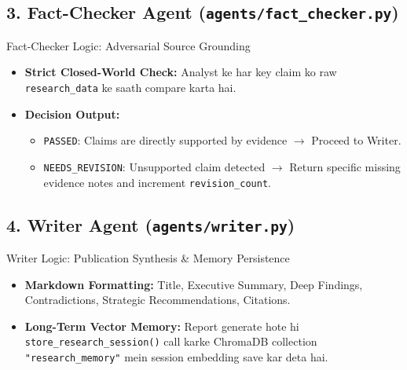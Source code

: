 \documentclass[9.5pt, a4paper]{article}
\begin{document}
\vspace{-4pt}
\subsection{3. Fact-Checker Agent (\texttt{agents/fact\_checker.py})}
\begin{agentbox}{Fact-Checker Logic: Adversarial Source Grounding}
\begin{itemize}
    \item \textbf{Strict Closed-World Check:} Analyst ke har key claim ko raw \texttt{research\_data} ke saath compare karta hai.
    \item \textbf{Decision Output:}
    \begin{itemize}
        \item \texttt{PASSED}: Claims are directly supported by evidence $\rightarrow$ Proceed to Writer.
        \item \texttt{NEEDS\_REVISION}: Unsupported claim detected $\rightarrow$ Return specific missing evidence notes and increment \texttt{revision\_count}.
    \end{itemize}
\end{itemize}
\end{agentbox}

\vspace{-4pt}
\subsection{4. Writer Agent (\texttt{agents/writer.py})}
\begin{agentbox}{Writer Logic: Publication Synthesis \& Memory Persistence}
\begin{itemize}
    \item \textbf{Markdown Formatting:} Title, Executive Summary, Deep Findings, Contradictions, Strategic Recommendations, Citations.
    \item \textbf{Long-Term Vector Memory:} Report generate hote hi \texttt{store\_research\_session()} call karke ChromaDB collection \texttt{"research\_memory"} mein session embedding save kar deta hai.
\end{itemize}
\end{agentbox}

\vspace{-4pt}
\end{document}
